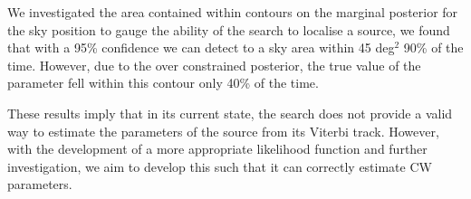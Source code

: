 We investigated the area contained within contours on the marginal posterior for the sky position to gauge the ability of the search to localise a source, we found that with a 95\% confidence we can detect to a sky area within 45 deg$^2$ 90\% of the time. 
However, due to the over constrained posterior, the true value of the parameter fell within this contour only 40\% of the time.

These results imply that in its current state, the search does not provide a valid way to estimate the parameters of the source from its Viterbi track.
However, with the development of a more appropriate likelihood function and further investigation, we aim to develop this such that it can correctly estimate \gls{CW} parameters.



















